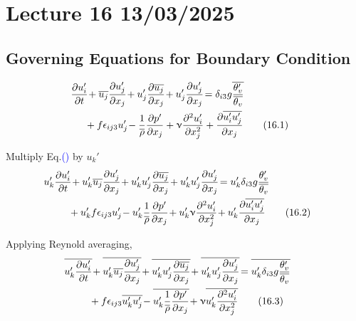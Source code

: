 \documentclass[fleqn,10pt]{SelfArx} %
\newcommand{\myeqref}[1]{Eq.\textcolor{blue}{\textup{(\getrefnumber{#1})}}}
\begin{document}
\clearpage

\section{Lecture 16 13/03/2025}
\subsection{Governing Equations for Boundary Condition}
\begin{align*}
	\mspace{-20mu} \frac{\partial u_i'}{\partial t} \! &+ \overline{u_j}\frac{\partial u_j'}{\partial x_j} \! + u_j'\frac{\partial \overline{u_j}}{\partial x_j} \! + u_j'\frac{\partial u_j'}{\partial x_j} \! = \delta_{i3}g \overline{\frac{\theta_v'}{\overline{\theta_v}}} \\ &\! + f\epsilon_{ij3}u_j' \! - \frac{1}{\overline{\rho}}\frac{\partial p'}{\partial x_j} + \upnu \frac{\partial^2 u_i'}{\partial x_j^2} + \frac{\partial \overline{u_i'u_j'}}{\partial x_j} \tag{16.1} \label{eq:16.1}
\end{align*}

Multiply \myeqref{eq:16.1} by \( u_k' \)
\begin{align*}
	\mspace{-28mu} u_k'\frac{\partial u_i'}{\partial t} \! &+ u_k'\overline{u_j}\frac{\partial u_j'}{\partial x_j} \! + u_k'u_j'\frac{\partial \overline{u_j}}{\partial x_j} \! + u_k'u_j'\frac{\partial u_j'}{\partial x_j} \! = u_k'\delta_{i3}g \frac{\theta_v'}{\overline{\theta_v}} \\ &\! + u_k'f\epsilon_{ij3}u_j' \! - u_k'\frac{1}{\overline{\rho}}\frac{\partial p'}{\partial x_j} \! + u_k'\upnu \frac{\partial^2 u_i'}{\partial x_j^2} \! + u_k'\frac{\partial \overline{u_i'u_j'}}{\partial x_j} \tag{16.2} \label{eq:16.2}
\end{align*}

Applying Reynold averaging,
\begin{align*}
	\mspace{-28mu} \overline{u_k'\frac{\partial u_i'}{\partial t}} \! &+ \overline{u_k'\overline{u_j}\frac{\partial u_j'}{\partial x_j}} \! + \overline{u_k'u_j'\frac{\partial \overline{u_j}}{\partial x_j}} \! + \overline{u_k'u_j'\frac{\partial u_j'}{\partial x_j}} \! = \overline{u_k'\delta_{i3}g\frac{\theta_v'}{\overline{\theta_v}}} \\ &\! + f\epsilon_{ij3}\overline{u_k'u_j'} \! - \overline{u_k'\frac{1}{\overline{\rho}}\frac{\partial p'}{\partial x_j}} \! + \upnu\overline{u_k'\frac{\partial^2 u_i'}{\partial x_j^2}} \tag{16.3} \label{eq:16.3}
\end{align*}
\end{document}
